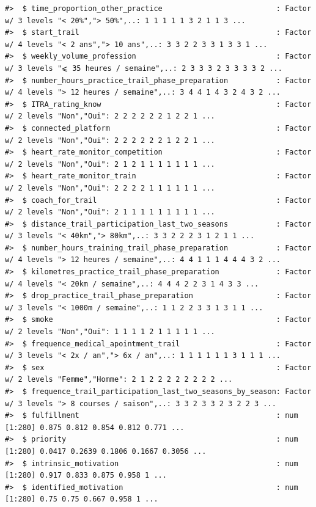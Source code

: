 \documentclass[
]{article}
\begin{document}
\begin{verbatim}
#>  $ time_proportion_other_practice                          : Factor w/ 3 levels "< 20%","> 50%",..: 1 1 1 1 1 3 2 1 1 3 ...
#>  $ start_trail                                             : Factor w/ 4 levels "< 2 ans","> 10 ans",..: 3 3 2 2 3 3 1 3 3 1 ...
#>  $ weekly_volume_profession                                : Factor w/ 3 levels "⩽ 35 heures / semaine",..: 2 3 3 3 2 3 3 3 3 2 ...
#>  $ number_hours_practice_trail_phase_preparation           : Factor w/ 4 levels "> 12 heures / semaine",..: 3 4 4 1 4 3 2 4 3 2 ...
#>  $ ITRA_rating_know                                        : Factor w/ 2 levels "Non","Oui": 2 2 2 2 2 2 1 2 2 1 ...
#>  $ connected_platform                                      : Factor w/ 2 levels "Non","Oui": 2 2 2 2 2 2 1 2 2 1 ...
#>  $ heart_rate_monitor_competition                          : Factor w/ 2 levels "Non","Oui": 2 1 2 1 1 1 1 1 1 1 ...
#>  $ heart_rate_monitor_train                                : Factor w/ 2 levels "Non","Oui": 2 2 2 2 1 1 1 1 1 1 ...
#>  $ coach_for_trail                                         : Factor w/ 2 levels "Non","Oui": 2 1 1 1 1 1 1 1 1 1 ...
#>  $ distance_trail_participation_last_two_seasons           : Factor w/ 3 levels "< 40km","> 80km",..: 3 3 2 2 2 3 1 2 1 1 ...
#>  $ number_hours_training_trail_phase_preparation           : Factor w/ 4 levels "> 12 heures / semaine",..: 4 4 1 1 1 4 4 4 3 2 ...
#>  $ kilometres_practice_trail_phase_preparation             : Factor w/ 4 levels "< 20km / semaine",..: 4 4 4 2 2 3 1 4 3 3 ...
#>  $ drop_practice_trail_phase_preparation                   : Factor w/ 3 levels "< 1000m / semaine",..: 1 1 2 2 3 3 1 3 1 1 ...
#>  $ smoke                                                   : Factor w/ 2 levels "Non","Oui": 1 1 1 1 2 1 1 1 1 1 ...
#>  $ frequence_medical_apointment_trail                      : Factor w/ 3 levels "< 2x / an","> 6x / an",..: 1 1 1 1 1 1 3 1 1 1 ...
#>  $ sex                                                     : Factor w/ 2 levels "Femme","Homme": 2 1 2 2 2 2 2 2 2 2 ...
#>  $ frequence_trail_participation_last_two_seasons_by_season: Factor w/ 3 levels "> 8 courses / saison",..: 3 3 2 3 3 2 3 2 2 3 ...
#>  $ fulfillment                                             : num [1:280] 0.875 0.812 0.854 0.812 0.771 ...
#>  $ priority                                                : num [1:280] 0.0417 0.2639 0.1806 0.1667 0.3056 ...
#>  $ intrinsic_motivation                                    : num [1:280] 0.917 0.833 0.875 0.958 1 ...
#>  $ identified_motivation                                   : num [1:280] 0.75 0.75 0.667 0.958 1 ...

\end{verbatim}
\end{document}
